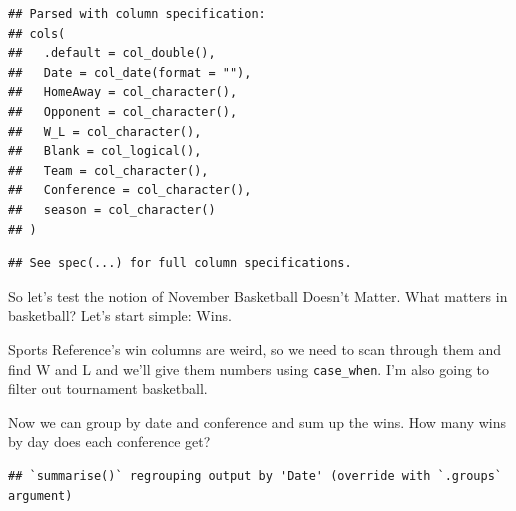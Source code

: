 \documentclass[
]{book}
\newenvironment{Shaded}{\begin{snugshade}}{\end{snugshade}}
\newcommand{\DataTypeTok}[1]{\textcolor[rgb]{0.13,0.29,0.53}{#1}}
\newcommand{\DecValTok}[1]{\textcolor[rgb]{0.00,0.00,0.81}{#1}}
\newcommand{\KeywordTok}[1]{\textcolor[rgb]{0.13,0.29,0.53}{\textbf{#1}}}
\newcommand{\NormalTok}[1]{#1}
\newcommand{\OperatorTok}[1]{\textcolor[rgb]{0.81,0.36,0.00}{\textbf{#1}}}
\newcommand{\StringTok}[1]{\textcolor[rgb]{0.31,0.60,0.02}{#1}}
\begin{document}
\begin{verbatim}
## Parsed with column specification:
## cols(
##   .default = col_double(),
##   Date = col_date(format = ""),
##   HomeAway = col_character(),
##   Opponent = col_character(),
##   W_L = col_character(),
##   Blank = col_logical(),
##   Team = col_character(),
##   Conference = col_character(),
##   season = col_character()
## )
\end{verbatim}

\begin{verbatim}
## See spec(...) for full column specifications.
\end{verbatim}

So let's test the notion of November Basketball Doesn't Matter. What matters in basketball? Let's start simple: Wins.

Sports Reference's win columns are weird, so we need to scan through them and find W and L and we'll give them numbers using \texttt{case\_when}. I'm also going to filter out tournament basketball.

\begin{Shaded}
\end{Shaded}

Now we can group by date and conference and sum up the wins. How many wins by day does each conference get?

\begin{Shaded}
\end{Shaded}

\begin{verbatim}
## `summarise()` regrouping output by 'Date' (override with `.groups` argument)
\end{verbatim}
\end{document}
